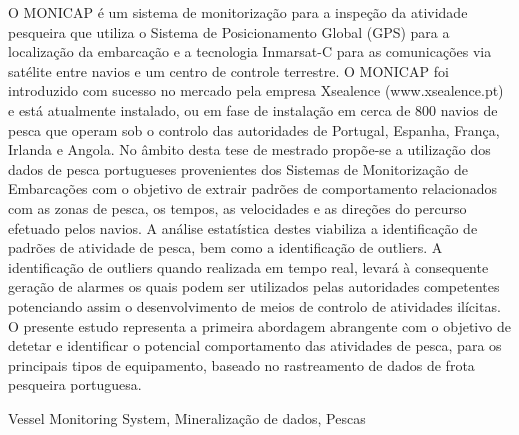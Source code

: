 \abstractPT  %

O MONICAP é um sistema de monitorização para a inspeção da atividade pesqueira que utiliza o Sistema de Posicionamento Global (GPS) para a localização da embarcação e a tecnologia Inmarsat-C para as comunicações via satélite entre navios e um centro de controle terrestre. O MONICAP foi introduzido com sucesso no mercado pela empresa Xsealence (www.xsealence.pt) e está atualmente instalado, ou em fase de instalação em cerca de 800 navios de pesca que operam sob o controlo das autoridades de Portugal, Espanha, França, Irlanda e Angola. No âmbito desta tese de mestrado propõe-se a utilização dos dados de pesca portugueses provenientes dos Sistemas de Monitorização de Embarcações com o objetivo de extrair padrões de comportamento relacionados com as zonas de pesca, os tempos, as velocidades e as direções do percurso efetuado pelos navios. A análise estatística destes viabiliza a identificação de padrões de atividade de pesca, bem como a identificação de outliers. A identificação de outliers quando realizada em tempo real, levará à consequente geração de alarmes os quais podem ser utilizados pelas autoridades competentes potenciando assim o desenvolvimento de meios de controlo de atividades ilícitas. O presente estudo representa a primeira abordagem abrangente com o objetivo de detetar e identificar o potencial comportamento das atividades de pesca, para os principais tipos de equipamento, baseado no rastreamento de dados de frota pesqueira portuguesa.


\begin{keywords}
Vessel Monitoring System, Mineralização de dados, Pescas
\end{keywords}
